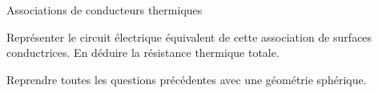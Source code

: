 \begin{exo}[PSI][1][colle]{Associations de conducteurs thermiques}
\begin{quest}
\setcounter{enumi}{3}

\item Représenter le circuit électrique équivalent de cette association de surfaces conductrices. En déduire la résistance thermique totale.


\item Reprendre toutes les questions précédentes avec une géométrie sphérique.

\end{quest}
\end{exo}

